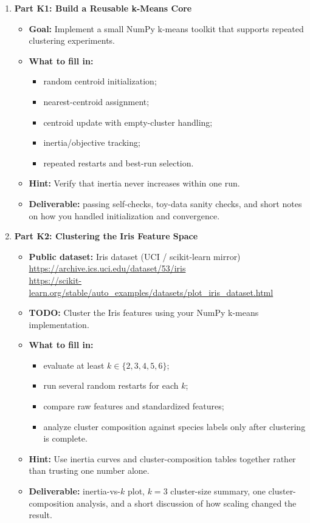\begin{enumerate}[label=\textbf{K\arabic*.}]
  \item \textbf{Part K1: Build a Reusable k-Means Core}
  \begin{itemize}
    \item \textbf{Goal:} Implement a small NumPy k-means toolkit that supports repeated clustering experiments.
    \item \textbf{What to fill in:}
    \begin{itemize}
      \item random centroid initialization;
      \item nearest-centroid assignment;
      \item centroid update with empty-cluster handling;
      \item inertia/objective tracking;
      \item repeated restarts and best-run selection.
    \end{itemize}
    \item \textbf{Hint:} Verify that inertia never increases within one run.
    \item \textbf{Deliverable:} passing self-checks, toy-data sanity checks, and short notes on how you handled initialization and convergence.
  \end{itemize}

  \item \textbf{Part K2: Clustering the Iris Feature Space}
  \begin{itemize}
    \item \textbf{Public dataset:} Iris dataset (UCI / scikit-learn mirror)\\
    \url{https://archive.ics.uci.edu/dataset/53/iris}\\
    \url{https://scikit-learn.org/stable/auto_examples/datasets/plot_iris_dataset.html}
    \item \textbf{TODO:} Cluster the Iris features using your NumPy k-means implementation.
    \item \textbf{What to fill in:}
    \begin{itemize}
      \item evaluate at least $k \in \{2,3,4,5,6\}$;
      \item run several random restarts for each $k$;
      \item compare raw features and standardized features;
      \item analyze cluster composition against species labels only after clustering is complete.
    \end{itemize}
    \item \textbf{Hint:} Use inertia curves and cluster-composition tables together rather than trusting one number alone.
    \item \textbf{Deliverable:} inertia-vs-$k$ plot, $k=3$ cluster-size summary, one cluster-composition analysis, and a short discussion of how scaling changed the result.
  \end{itemize}


\end{enumerate}
